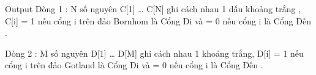 Output
Dòng 1 : N số nguyên C[1] … C[N] ghi cách nhau 1 dấu khoảng trắng , C[i] = 1 nếu cổng i trên đảo Bornhom là Cổng Đi và = 0 nếu cổng i là Cổng Đến .


Dòng 2 : M số nguyên D[1] … D[M] ghi cách nhau 1 khoảng trắng, D[i] = 1 nếu cổng i trên đảo Gotland là Cổng Đi và = 0 nếu cổng i là Cổng Đến .